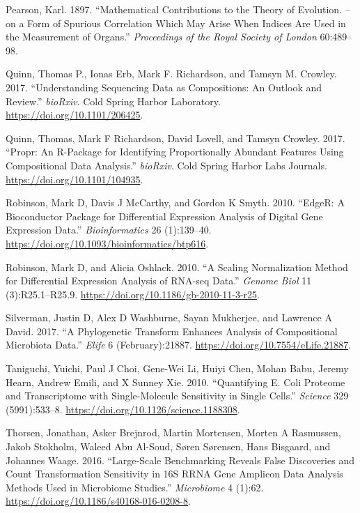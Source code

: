 \documentclass[onecolumn]{book}
\theoremstyle{definition}
\theoremstyle{definition}
\theoremstyle{definition}
\theoremstyle{remark}
\begin{document}
\leavevmode\hypertarget{ref-Pearson:1896}{}%
Pearson, Karl. 1897. ``Mathematical Contributions to the Theory of
Evolution. -- on a Form of Spurious Correlation Which May Arise When
Indices Are Used in the Measurement of Organs.'' \emph{Proceedings of
the Royal Society of London} 60:489--98.

\leavevmode\hypertarget{ref-Quinn206425}{}%
Quinn, Thomas P., Ionas Erb, Mark F. Richardson, and Tamsyn M. Crowley.
2017. ``Understanding Sequencing Data as Compositions: An Outlook and
Review.'' \emph{bioRxiv}. Cold Spring Harbor Laboratory.
\url{https://doi.org/10.1101/206425}.

\leavevmode\hypertarget{ref-Quinn:2017}{}%
Quinn, Thomas, Mark F Richardson, David Lovell, and Tamsyn Crowley.
2017. ``Propr: An R-Package for Identifying Proportionally Abundant
Features Using Compositional Data Analysis.'' \emph{bioRxiv}. Cold
Spring Harbor Labs Journals. \url{https://doi.org/10.1101/104935}.

\leavevmode\hypertarget{ref-Robinson:2010}{}%
Robinson, Mark D, Davis J McCarthy, and Gordon K Smyth. 2010. ``EdgeR: A
Bioconductor Package for Differential Expression Analysis of Digital
Gene Expression Data.'' \emph{Bioinformatics} 26 (1):139--40.
\url{https://doi.org/10.1093/bioinformatics/btp616}.

\leavevmode\hypertarget{ref-Robinson:2010a}{}%
Robinson, Mark D, and Alicia Oshlack. 2010. ``A Scaling Normalization
Method for Differential Expression Analysis of RNA-seq Data.''
\emph{Genome Biol} 11 (3):R25.1--R25.9.
\url{https://doi.org/10.1186/gb-2010-11-3-r25}.

\leavevmode\hypertarget{ref-Silverman:2017aa}{}%
Silverman, Justin D, Alex D Washburne, Sayan Mukherjee, and Lawrence A
David. 2017. ``A Phylogenetic Transform Enhances Analysis of
Compositional Microbiota Data.'' \emph{Elife} 6 (February):21887.
\url{https://doi.org/10.7554/eLife.21887}.

\leavevmode\hypertarget{ref-Taniguchi:2010aa}{}%
Taniguchi, Yuichi, Paul J Choi, Gene-Wei Li, Huiyi Chen, Mohan Babu,
Jeremy Hearn, Andrew Emili, and X Sunney Xie. 2010. ``Quantifying E.
Coli Proteome and Transcriptome with Single-Molecule Sensitivity in
Single Cells.'' \emph{Science} 329 (5991):533--8.
\url{https://doi.org/10.1126/science.1188308}.

\leavevmode\hypertarget{ref-Thorsen:2016aa}{}%
Thorsen, Jonathan, Asker Brejnrod, Martin Mortensen, Morten A Rasmussen,
Jakob Stokholm, Waleed Abu Al-Soud, Søren Sørensen, Hans Bisgaard, and
Johannes Waage. 2016. ``Large-Scale Benchmarking Reveals False
Discoveries and Count Transformation Sensitivity in 16S RRNA Gene
Amplicon Data Analysis Methods Used in Microbiome Studies.''
\emph{Microbiome} 4 (1):62.
\url{https://doi.org/10.1186/s40168-016-0208-8}.
\end{document}
